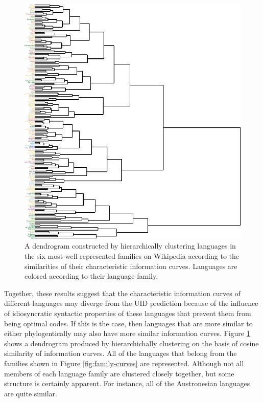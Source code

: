 \documentclass[entropy,article,submit,moreauthors,pdftex]{mdpi}
\begin{document}
\begin{figure}[tb]

{\centering \includegraphics{figs/dendro-1} 

}

\caption{A dendrogram constructed by hierarchically clustering languages in the six most-well represented families on Wikipedia according to the similarities of their characteristic information curves. Languages are colored according to their language family.}\label{fig:dendro}
\end{figure}

Together, these results suggest that the characteristic information
curves of different languages may diverge from the UID prediction
because of the influence of idiosyncratic syntactic properties of these
languages that prevent them from being optimal codes. If this is the
case, then languages that are more similar to either phylogentically may
also have more similar information curves. Figure \ref{fig:dendro} shows
a dendrogram produced by hierarchichally clustering on the basis of
cosine similarity of information curves. All of the languages that
belong from the families shown in Figure \ref{fig:family-curves} are
represented. Although not all members of each language family are
clustered closely together, but some structure is certainly apparent.
For instance, all of the Austronesian languages are quite similar.
\end{document}
